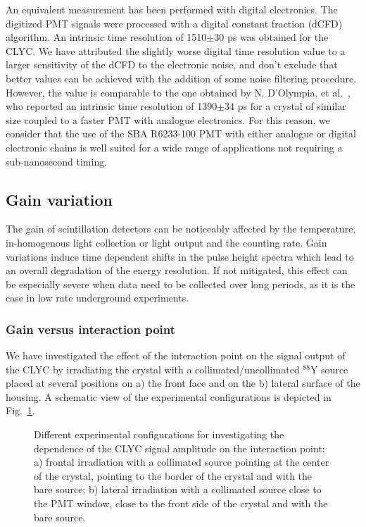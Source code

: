 \documentclass[review,number,sort&compress]{elsarticle}
\begin{document}
An equivalent measurement has been performed with digital electronics. The digitized PMT signals were processed with a digital constant fraction (dCFD) algorithm. An intrinsic time resolution of 1510$\pm$30 ps was obtained for the CLYC. We have attributed the slightly worse digital time resolution value to a larger sensitivity of the dCFD to the electronic noise, and don't exclude that better values can be achieved with the addition of some noise filtering procedure. However, the value is comparable to the one obtained by N. D'Olympia, et al.~\cite{Oly2}, who reported an intrinsic time resolution of 1390$\pm$34 ps for a crystal of similar size coupled to a faster PMT with analogue electronics. For this reason, we consider that the use of the SBA R6233-100 PMT with either analogue or digital electronic chains is well suited for a wide range of applications not requiring a sub-nanosecond timing.
 

\subsection{Gain variation}

The gain of scintillation detectors can be noticeably affected by the temperature, in-homogenous light collection or light output and the counting rate. Gain variations induce time dependent shifts in the pulse height spectra which lead to an overall degradation of the energy resolution. If not mitigated, this effect can be especially severe when data need to be collected over long periods, as it is the case in low rate underground experiments. 

\subsubsection*{Gain versus interaction point}

We have investigated the effect of the interaction point on the signal output of the CLYC by irradiating the crystal with a collimated/uncollimated $^{88}$Y source placed at several positions on a) the front face and on the b) lateral surface of the housing. A schematic view of the experimental configurations is depicted in Fig.~\ref{irradiation}. 


\begin{figure}[h!]
\centering
{}\label{frontal_irradiation}
\label{lateral_irradiation}
\caption{Different experimental configurations for investigating the dependence of the CLYC signal amplitude on the interaction point: a) frontal irradiation with a collimated source pointing at the center of the crystal, pointing to the border of the crystal and with the bare source; b) lateral irradiation with a collimated source close to the PMT window, close to the front side of the crystal and with the bare source.}
\label{irradiation}
\end{figure}
\end{document}
